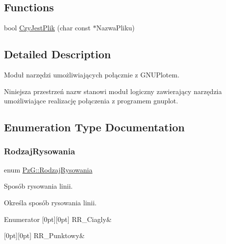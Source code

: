 \subsection*{Functions}
\begin{DoxyCompactItemize}
\item 
bool \hyperlink{namespacePzG_ae1ae4d36f66c77879380ba73da8e20e3}{Czy\+Jest\+Plik} (char const $\ast$Nazwa\+Pliku)
\end{DoxyCompactItemize}


\subsection{Detailed Description}
Moduł narzędzi umożliwiających połącznie z G\+N\+U\+Plotem. 

Niniejsza przestrzeń nazw stanowi moduł logiczny zawierający narzędzia umożliwiające realizację połączenia z programem {\ttfamily gnuplot}. 

\subsection{Enumeration Type Documentation}
\mbox{\label{namespacePzG_a705c92106f39b7d0c34a6739d10ff0b6}} 
\subsubsection{\texorpdfstring{Rodzaj\+Rysowania}{RodzajRysowania}}
{\footnotesize\ttfamily enum \hyperlink{namespacePzG_a705c92106f39b7d0c34a6739d10ff0b6}{Pz\+G\+::\+Rodzaj\+Rysowania}}



Sposób rysowania linii. 

Określa sposób rysowania linii. \begin{DoxyEnumFields}{Enumerator}
[0pt][0pt]{}\mbox{\label{namespacePzG_a705c92106f39b7d0c34a6739d10ff0b6a927eaa159aa4bd3198f0a330b967746d}} 
R\+R\+\_\+\+Ciagly&\\
\hline

[0pt][0pt]{}\mbox{\label{namespacePzG_a705c92106f39b7d0c34a6739d10ff0b6aa01097ee8266d6402b752ef6f9a4690c}} 
R\+R\+\_\+\+Punktowy&\\
\hline

\end{DoxyEnumFields}
\mbox{\label{namespacePzG_aeedae1ef10c66d720f9e89de408ca4ca}} 
